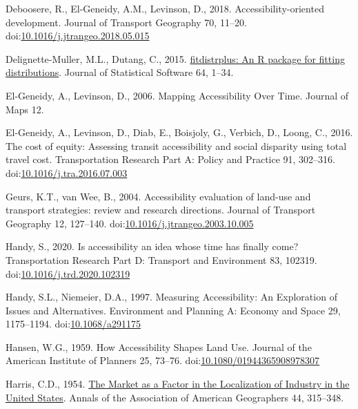\documentclass[]{elsarticle} %
\newlength{\cslhangindent}
\newlength{\cslentryspacingunit} %
\newenvironment{CSLReferences}[2] %
 {%
  \setlength{\parindent}{0pt}
  \ifodd #1
  \let\oldpar\par
  \def\par{\hangindent=\cslhangindent\oldpar}
  \fi
  \setlength{\parskip}{#2\cslentryspacingunit}
 }%
 {}
\begin{document}
\begin{CSLReferences}{1}{0}
\leavevmode{}%
Deboosere, R., El-Geneidy, A.M., Levinson, D., 2018.
Accessibility-oriented development. Journal of Transport Geography 70,
11--20.
doi:\href{https://doi.org/10.1016/j.jtrangeo.2018.05.015}{10.1016/j.jtrangeo.2018.05.015}

\leavevmode{}%
Delignette-Muller, M.L., Dutang, C., 2015.
\href{https://www.jstatsoft.org/article/view/v064i04}{{fitdistrplus}: An
{R} package for fitting distributions}. Journal of Statistical Software
64, 1--34.

\leavevmode{}%
El-Geneidy, A., Levinson, D., 2006. Mapping {Accessibility} {Over}
{Time}. Journal of Maps 12.

\leavevmode{}%
El-Geneidy, A., Levinson, D., Diab, E., Boisjoly, G., Verbich, D.,
Loong, C., 2016. The cost of equity: {Assessing} transit accessibility
and social disparity using total travel cost. Transportation Research
Part A: Policy and Practice 91, 302--316.
doi:\href{https://doi.org/10.1016/j.tra.2016.07.003}{10.1016/j.tra.2016.07.003}

\leavevmode{}%
Geurs, K.T., van Wee, B., 2004. Accessibility evaluation of land-use and
transport strategies: review and research directions. Journal of
Transport Geography 12, 127--140.
doi:\href{https://doi.org/10.1016/j.jtrangeo.2003.10.005}{10.1016/j.jtrangeo.2003.10.005}

\leavevmode{}%
Handy, S., 2020. Is accessibility an idea whose time has finally come?
Transportation Research Part D: Transport and Environment 83, 102319.
doi:\href{https://doi.org/10.1016/j.trd.2020.102319}{10.1016/j.trd.2020.102319}

\leavevmode{}%
Handy, S.L., Niemeier, D.A., 1997. Measuring {Accessibility}: {An}
{Exploration} of {Issues} and {Alternatives}. Environment and Planning
A: Economy and Space 29, 1175--1194.
doi:\href{https://doi.org/10.1068/a291175}{10.1068/a291175}

\leavevmode{}%
Hansen, W.G., 1959. How Accessibility Shapes Land Use. Journal of the
American Institute of Planners 25, 73--76.
doi:\href{https://doi.org/10.1080/01944365908978307}{10.1080/01944365908978307}

\leavevmode{}%
Harris, C.D., 1954. \href{https://www.jstor.org/stable/2561395}{The
{Market} as a {Factor} in the {Localization} of {Industry} in the
{United} {States}}. Annals of the Association of American Geographers
44, 315--348.


\end{CSLReferences}
\end{document}
